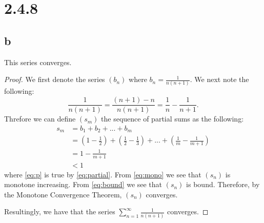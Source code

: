 \documentclass[10pt]{article}
\begin{document}
\section*{2.4.8}
\subsection*{b}
This series converges.

\begin{proof}
    We first denote the series $(b_n)$ where $b_n = \frac{1}{n(n+1)}.$
    We next note the following:
    \begin{equation} \label{eq:partial}
        \frac{1}{n(n+1)} = \frac{(n+1)-n}{n(n+1)} = \frac{1}{n} - \frac{1}{n+1}.
    \end{equation}
    Threfore we can define $(s_m)$ the sequence of partial sums as the following:
    \begin{align}
        s_m &= b_1 + b_2 + ... + b_m \nonumber\\
        &= (1-\frac{1}{2}) + (\frac{1}{2}-\frac{1}{3}) + ... + (\frac{1}{m}-\frac{1}{m+1}) \label{eq:p}\\
        &= 1 - \frac{1}{m+1}\label{eq:mono}\\
        &< 1 \label{eq:bound}
    \end{align}
    where \eqref{eq:p} is true by \eqref{eq:partial}. From \eqref{eq:mono} we see that $(s_n)$ is monotone increasing. From \eqref{eq:bound} we see that $(s_n)$ is bound. Therefore, by the Monotone Convergence Theorem, $(s_n)$ converges.

    Resultingly, we have that the series $\sum_{n=1}^\infty\frac{1}{n(n+1)}$ converges.
\end{proof}
\end{document}

